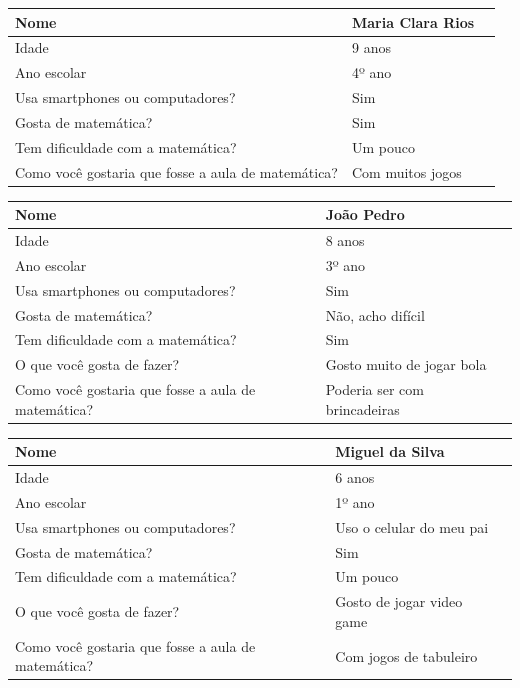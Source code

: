 \documentclass[
    12pt,               %
    openany,          	%
    twoside,            %
    a4paper,            %
    brazil              %
    ]{abntex2}
\begin{document}
\begin{center} \begin{tabular}{ | l | p{5cm} | p{6cm} }
\hline Nome & Maria Clara Rios \\\hline
Idade & 9 anos\\ \hline
Ano escolar & 4º ano\\ \hline Usa
smartphones ou computadores? & Sim \\ \hline
Gosta de matemática? & Sim \\ \hline
Tem dificuldade com a matemática? & Um pouco \\ \hline
Como você gostaria que fosse a aula de matemática? & Com muitos jogos \\ \hline
\end{tabular} \end{center}

\begin{center} \begin{tabular}{ | l | p{5cm} | p{6cm} }
\hline Nome & João Pedro \\\hline
Idade & 8 anos\\ \hline
Ano escolar & 3º ano\\ \hline Usa
smartphones ou computadores? & Sim \\ \hline
Gosta de matemática? & Não, acho difícil \\ \hline
Tem dificuldade com a matemática? & Sim \\ \hline
O que você gosta de fazer? & Gosto muito de jogar bola \\ \hline
Como você gostaria que fosse a aula de matemática? & Poderia ser com brincadeiras \\ \hline
\end{tabular} \end{center}

\begin{center} \begin{tabular}{ | l | p{5cm} | p{6cm} }
\hline Nome & Miguel da Silva \\\hline
Idade & 6 anos\\ \hline
Ano escolar & 1º ano\\ \hline Usa
smartphones ou computadores? & Uso o celular do meu pai \\ \hline
Gosta de matemática? & Sim \\ \hline
Tem dificuldade com a matemática? & Um pouco \\ \hline
O que você gosta de fazer? & Gosto de jogar video game \\ \hline
Como você gostaria que fosse a aula de matemática? & Com jogos de tabuleiro \\ \hline
\end{tabular} \end{center}
\end{document}
